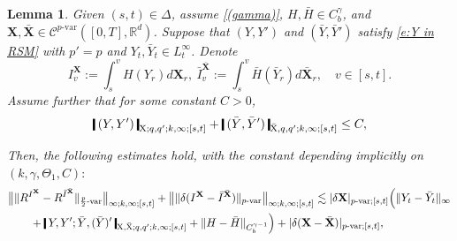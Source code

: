 \documentclass[11pt,reqno]{amsart}
\newtheorem{lemma}{Lemma}[section]
\numberwithin{equation}{section}
\def\R{\mathbb R}
\newcommand{\shortthickbar}{%
  \vcenter{\hbox{\rule{1.8pt}{2.2ex}}}%
}
\newcommand{\thicknm}[1]{%
  \mathopen{\shortthickbar}%
  \mkern4mu #1 \mkern4mu%
  \mathclose{\shortthickbar}%
}
\begin{document}
\begin{lemma}\label{lem:Gamma and I}
Given $(s,t) \in \Delta$, assume \ref{(gamma)}, $H, \bar H\in C^{\gamma}_b$, and $\mathbf X, \bar{\mathbf X} \in \mathscr{C}^{p\text{-}\mathrm{var}}([0,T],\R^d)$. 
Suppose that $(Y,Y')$ and $(\bar Y,\bar Y')$ satisfy \eqref{e:Y in RSM} with $p' = p$ and $Y_{t},\bar Y_{t} \in L^{\infty}_t$. Denote 
\begin{equation*}
I^{\mathbf X}_{v} := \int_{s}^{v} H(Y_r) d\mathbf X_r,\ \bar I^{\bar{\mathbf X}}_{v} := \int_{s}^{v} \bar H (\bar  Y_r) d\bar {\mathbf X}_r,\quad v \in [s,t]. 
\end{equation*}
Assume further that for some constant $C>0$,  
\begin{equation}\label{e:upper bound uni in n}
\begin{aligned}
\thicknm{(Y,Y')}_{\mathrm X;q,q';k,\infty;[s,t]} + \thicknm{ (\bar Y,\bar Y' ) }_{\bar {\mathrm X} ,q, q';k,\infty;[s,t]} \le C,
\end{aligned}
\end{equation}

Then, the following estimates hold, with the constant depending implicitly on $(k,\gamma,\Theta_{1},C):$ 
\begin{equation}\label{e:R^Gamma <= R^H(Y)}
\begin{aligned}
&\big\| \|R^{I^{\mathbf X}} - R^{\bar I^{\bar {\mathbf X}}}\|_{\frac{p}{2}\text{-}\mathrm{var}} \big\|_{\infty;k,\infty;[s,t]} + \big\| \|\delta(I^{\mathbf X} - \bar I^{\bar{\mathbf X}})\|_{p\text{-}\mathrm{var}} \big\|_{\infty;k,\infty;[s,t]} \lesssim |\delta \mathbf X|_{p\text{-}\mathrm{var};[s,t]} \Big(\|Y_t - \bar Y_t\|_{\infty} 
\\ 
& \quad \quad + \thicknm{Y ,Y'; \bar Y, (\bar Y)'}_{\mathrm X,\bar{\mathrm X};q,q';k,\infty;[s,t]} + \|H - \bar H\|_{C^{\gamma - 1}_{b}}\Big) + |\delta( \mathbf X - \bar{\mathbf X} )|_{p\text{-}\mathrm{var};[s,t]}, \\
\end{aligned}
\end{equation}
\end{lemma}
\end{document}
